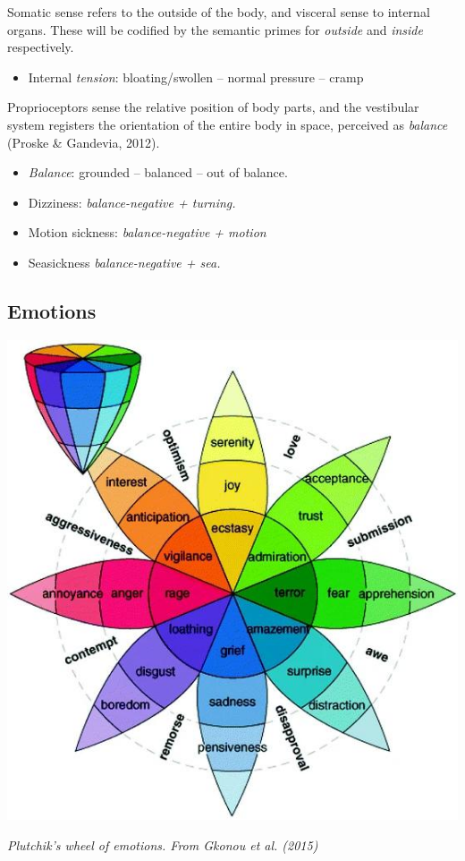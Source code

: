 Somatic sense refers to the outside of the body, and visceral sense to internal organs. These will be codified by the semantic primes for \textit{outside} and \textit{inside} respectively.   

\begin{itemize}
	\item Internal \textit{tension}: bloating/swollen – normal pressure – cramp  
\end{itemize}

Proprioceptors sense the relative position of body parts, and the vestibular system registers the orientation of the entire body in space, perceived as \textit{balance} (Proske \& Gandevia, 2012).  

\begin{itemize}
	\item \textit{Balance}: grounded – balanced – out of balance.  

	\item Dizziness: \textit{balance-negative + turning.} 

	\item Motion sickness:  \textit{ balance-negative + motion } 

	\item Seasickness \textit{balance-negative + sea.} 
\end{itemize}


\subsection{Emotions}

\begin{center}
	\includegraphics[scale=0.45]{./Images/emotions.jpg}

	{\it \footnotesize Plutchik's wheel of emotions. From Gkonou et al. (2015)}
\end{center}

